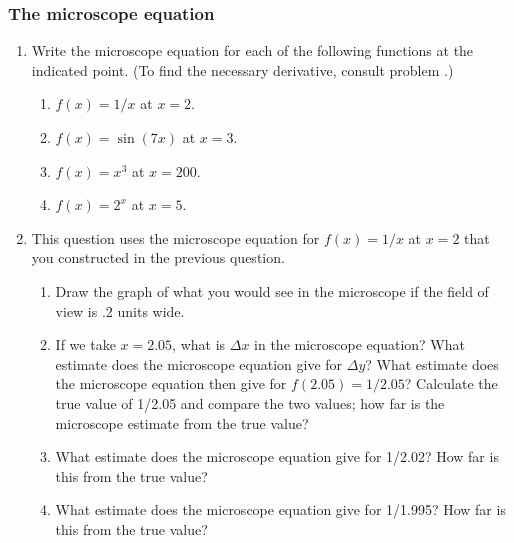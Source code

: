 \subsubsection{The microscope equation}
\label{subsubsec:the-microscope-equation}




\begin{enumerate}
\item Write the microscope equation for each of the following functions
at the indicated point.  (To find the necessary derivative, consult
problem \thederivexercise.)



  \begin{enumerate}
  \item $f(x) = 1/x$ at $x = 2$.

  \item $f(x) = \sin(7x)$ at $x = 3$.

  \item $f(x) = x^3$ at $x = 200$.

  \item $f(x) = 2^x$ at $x = 5$.



\end{enumerate}
\item This question uses the microscope equation for $f(x) = 1/x$ at $x
= 2$ that you constructed in the previous question.

  \begin{enumerate}
  \item Draw the graph of what you would see in the microscope if the
field of view is .2 units wide.

  \item If we take $x = 2.05$, what is $\Delta x$ in the microscope
equation?  What estimate does the microscope equation give for $\Delta
y$?  What estimate does the microscope equation then give for $f(2.05)
= 1/2.05$?  Calculate the true value of 1/2.05 and compare the two
values; how far is the microscope estimate from the true value?

  \item What estimate does the microscope equation give for 1/2.02?  How
far is this from the true value?

  \item What estimate does the microscope equation give for 1/1.995?  How
far is this from the true value?




\end{enumerate}
\end{enumerate}
